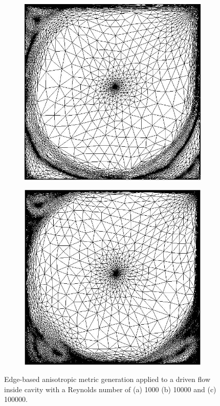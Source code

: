 \begin{figure}[htbp]
\begin{subfigure}[t]{0.3\textwidth}
	\includegraphics[width=\textwidth]{Chapter2/Graphics/remesh4_10000.png}
	\caption{}
  \end{subfigure}
  \begin{subfigure}[t]{0.3\textwidth}
    \centering
	\includegraphics[width=\textwidth]{Chapter2/Graphics/remesh4_100000.png}
	\caption{}
  \end{subfigure}
\caption{Edge-based anisotropic metric generation applied to a driven flow inside cavity with a Reynolds number of (a) \num{1000} (b) \num{10000} and (c) \num{100000}. } 
\label{fig:remesh4}
\end{figure}

